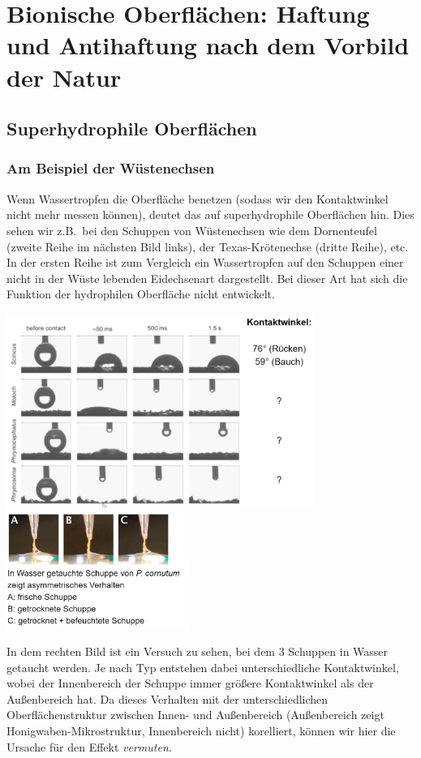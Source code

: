 \section{Bionische Oberflächen: Haftung und Antihaftung nach dem Vorbild der Natur}

\subsection{Superhydrophile Oberflächen}

\subsubsection{Am Beispiel der Wüstenechsen}

Wenn Wassertropfen die Oberfläche benetzen (sodass wir den Kontaktwinkel nicht mehr messen können), deutet das auf superhydrophile Oberflächen hin. Dies sehen wir z.B.\ bei den Schuppen von Wüstenechsen wie dem Dornenteufel (zweite Reihe im nächsten Bild links), der Texas-Krötenechse (dritte Reihe), etc. In der ersten Reihe ist zum Vergleich ein Wassertropfen auf den Schuppen einer nicht in der Wüste lebenden Eidechsenart dargestellt. Bei dieser Art hat sich die Funktion der hydrophilen Oberfläche nicht entwickelt.

\begin{center}
    \includegraphics[width=10cm]{lec3/figures/Benetzung.png}
    \hfill
    \includegraphics[width=6cm]{lec3/figures/Tauchen.png}
\end{center}
In dem rechten Bild ist ein Versuch zu sehen, bei dem 3 Schuppen in Wasser getaucht werden. Je nach Typ entstehen dabei unterschiedliche Kontaktwinkel, wobei der Innenbereich der Schuppe immer größere Kontaktwinkel als der Außenbereich hat. Da dieses Verhalten mit der unterschiedlichen Oberflächenstruktur zwischen Innen- und Außenbereich (Außenbereich zeigt Honigwaben-Mikrostruktur, Innenbereich nicht) korelliert, können wir hier die Ursache für den Effekt \textit{vermuten}.\\

